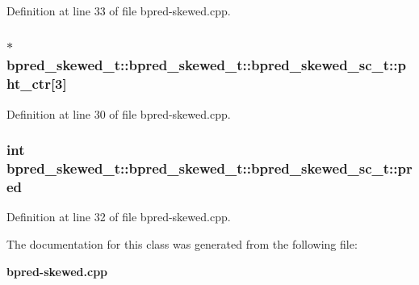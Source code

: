 Definition at line 33 of file bpred-skewed.cpp.
\subsubsection[{pht\_\-ctr}]{$\ast$ bpred\_\-skewed\_\-t::bpred\_\-skewed\_\-t::bpred\_\-skewed\_\-sc\_\-t::pht\_\-ctr[3]}\label{classbpred__skewed__t_1_1bpred__skewed__sc__t_6cae7c343766e52929651af5383b617b}




Definition at line 30 of file bpred-skewed.cpp.
\subsubsection[{pred}]{\setlength{\rightskip}{0pt plus 5cm}int bpred\_\-skewed\_\-t::bpred\_\-skewed\_\-t::bpred\_\-skewed\_\-sc\_\-t::pred}\label{classbpred__skewed__t_1_1bpred__skewed__sc__t_277c26b3476751c5c858740eb58a41d9}




Definition at line 32 of file bpred-skewed.cpp.

The documentation for this class was generated from the following file:\begin{CompactItemize}
\item 
{\bf bpred-skewed.cpp}\end{CompactItemize}
